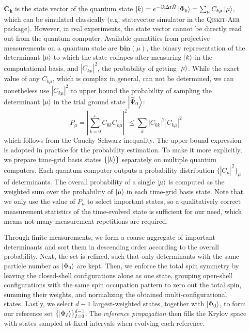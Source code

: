 \documentclass[journal=jctcce,manuscript=article]{achemso}
\begin{document}
$\mathbf{C_{k }}$ is the state vector of the quantum state $\left\vert{k}\right\rangle = e^{-i k \Delta t \hat{H}} \left\vert{\Phi_0}\right\rangle = \sum_{\mu} C_{k \mu} \left\vert{\mu}\right\rangle$, which can be simulated classically (e.g. statevector simulator in the \textsc{Qiskit-Aer}\cite{Qiskit} package). However, in real experiments, the state vector cannot be directly read out from the quantum computer. 
Available quantities from projective measurements on a quantum state are 
$\mathbf{bin}(\mu)$, the binary representation of the determinant $\left\vert{\mu}\right\rangle$ to which the state collapes after measuring $\left\vert{k}\right\rangle$ in the computational basis, 
and $|C_{k \mu}|^2$, the probability of getting $\left\vert{\mu}\right\rangle$.\cite{rieffel2011quantum}
While the exact value of any $C_{k \mu}$, which is complex in general, can not be determined, we can nonetheless use $|C_{k \mu}|^2$ to upper bound the probability of sampling the determinant $\left\vert{\mu}\right\rangle$ in the trial ground state $\left\vert{\widetilde{\Psi}_{0}}\right\rangle$:
\begin{equation}
P_{\mu} =  | \sum_{k=0}^{s^{\prime}}  C_{0 k} C_{k \mu}  |^2   
\leqslant  \sum_{k} |C_{0 k} |^{2}  |C_{k \mu}|^{2} 
\end{equation}
which follows from the Cauchy-Schwarz inequality.
The upper bound expression is adopted in practice for the probability estimation.
To make it more explicitly, we prepare time-grid basis states $\{\left\vert{k}\right\rangle\}$ separately on multiple quantum computers. Each quantum computer outputs a probability distribution $\{|C_{\mu} |^{2}\}_{\mu}$ of determinants. 
The overall probability of a single $\left\vert{\mu}\right\rangle$ is computed as the weighted sum over the probability of $\left\vert{\mu}\right\rangle$ in each time-grid basis state. 
Note that we only use the value of $P_{\mu}$ to select important states, so a qualitatively correct measurement statistics of the time-evolved state is sufficient for our need, which means not many measurement repetitions are required. 

Through finite measurements, we form a coarse aggregate of important determinants and sort them in descending order according to the overall probability. 
Next, the set is refined, such that only determinants with the same particle number as $\left\vert{\Phi_0}\right\rangle$ are kept. 
Then, we enforce the total spin symmetry by leaving the closed-shell configurations alone as one state, grouping open-shell configurations with the same spin occupation pattern to zero out the total spin, summing their weights, and normalizing the obtained multi-configurational states.
Lastly, we select $d-1$ largest-weighted states, together with $\left\vert{\Phi_0}\right\rangle$, to form our reference set $\{ \left\vert{\Phi_{I}}\right\rangle \}_{I=0}^{d-1}$.
The \textit{reference propagation} then fills the Krylov space with states sampled at fixed intervals when evolving each reference.
\end{document}
